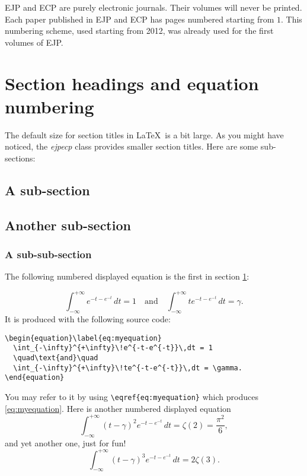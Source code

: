 \documentclass[ECP]{ejpecp} %
\begin{document}
EJP and ECP are purely electronic journals. Their volumes will never be
printed. Each paper published in EJP and ECP has pages numbered starting from
$1$. This numbering scheme, used starting from 2012, was already used for the
first volumes of EJP.

\section{Section headings and equation numbering}\label{se:mysection}

The default size for section titles in \LaTeX\ is a bit large. As you might have
noticed, the \emph{ejpecp} class provides smaller section titles. Here are some
sub-sections:

\subsection{A sub-section}

\subsection{Another sub-section}

\subsubsection{A sub-sub-section}

The following numbered displayed equation is the first in section \ref{se:mysection}:

\begin{equation}\label{eq:myequation}
  \int_{-\infty}^{+\infty}\!e^{-t-e^{-t}}\,dt = 1
  \quad\text{and}\quad
  \int_{-\infty}^{+\infty}\!te^{-t-e^{-t}}\,dt = \gamma.
\end{equation}
It is produced with the following source code:
\begin{verbatim}
\begin{equation}\label{eq:myequation}
  \int_{-\infty}^{+\infty}\!e^{-t-e^{-t}}\,dt = 1
  \quad\text{and}\quad
  \int_{-\infty}^{+\infty}\!te^{-t-e^{-t}}\,dt = \gamma.
\end{equation}
\end{verbatim}
You may refer to it by using \verb+\eqref{eq:myequation}+ which
produces \eqref{eq:myequation}. Here is another numbered displayed equation
\begin{equation}
  \int_{-\infty}^{+\infty}\!(t-\gamma)^2e^{-t-e^{-t}}\,dt
  = \zeta(2)
  = \frac{\pi^2}{6},
\end{equation}
and yet another one, just for fun!
\begin{equation}
  \int_{-\infty}^{+\infty}\!(t-\gamma)^3e^{-t-e^{-t}}\,dt
  = 2\zeta(3).
\end{equation}
\end{document}
